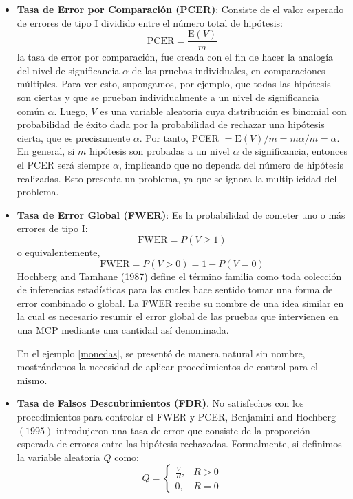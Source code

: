 \documentclass[11pt,letterpaper]{article}
\begin{document}
\begin{itemize}
\item \textbf{Tasa de Error por Comparación (PCER)}: Consiste de el valor esperado de errores de tipo I dividido entre el número total de hipótesis:
$$
\mathrm{PCER}=\frac{\mathrm{E}(V) }{m}
$$
la tasa de error por comparación, fue creada con el fin de hacer la analogía del nivel de significancia $\alpha$ de las pruebas individuales, en comparaciones múltiples. Para ver esto, supongamos, por ejemplo, que todas las hipótesis son ciertas y que se prueban individualmente a un nivel de significancia común $\alpha$. Luego, $V$ es una variable aleatoria cuya distribución es binomial con probabilidad de éxito dada por la probabilidad de rechazar una hipótesis cierta, que es precisamente $\alpha .$ Por tanto, PCER $=\mathrm{E}(V) / m=m \alpha / m=\alpha .$ En general, si $m$ hipótesis son probadas a un nivel $\alpha$ de significancia, entonces el PCER será siempre $\alpha$, implicando que no dependa del número de hipótesis realizadas. Esto presenta un problema, ya que se ignora la multiplicidad del problema.

\item \textbf{Tasa de Error Global (FWER)}: Es la probabilidad de cometer uno o más errores de tipo I:
$$
\mathrm{FWER}=P(V \geq 1)
$$
o equivalentemente,
$$
\mathrm{FWER}=P(V>0)=1-P(V=0)
$$
Hochberg and Tamhane (1987) define el término familia como toda colección de inferencias estadísticas para las cuales hace sentido tomar una forma de error combinado o global. La FWER recibe su nombre de una idea similar en la cual es necesario resumir el error global de las pruebas que intervienen en una MCP mediante una cantidad así denominada.

En el ejemplo \ref{monedas}, se presentó de manera natural sin nombre, mostrándonos la necesidad de aplicar procedimientos de control para el mismo.

\item \textbf{Tasa de Falsos Descubrimientos (FDR)}. No satisfechos con los procedimientos para controlar el FWER y PCER, Benjamini and Hochberg $(1995)$ introdujeron una tasa de error que consiste de la proporción esperada de errores entre las hipótesis rechazadas. Formalmente, si definimos la variable aleatoria $Q$ como:
$$
Q=\left\{\begin{array}{ll}
	\frac{V}{R}, & R>0 \\
	0, & R=0
\end{array}\right.
$$
\end{itemize}
\end{document}
